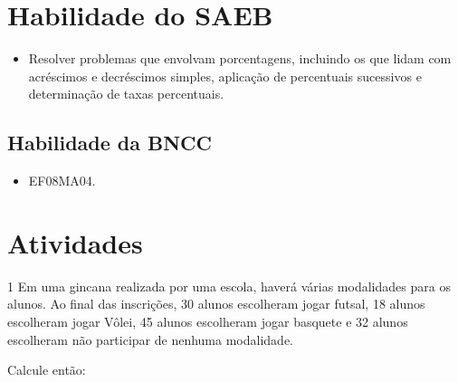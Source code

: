 \section{Habilidade do SAEB} 

\begin{itemize}
\item Resolver problemas que envolvam porcentagens,
incluindo os que lidam com acréscimos e decréscimos simples, aplicação
de percentuais sucessivos e determinação de taxas percentuais.
\end{itemize}

\subsection{Habilidade da BNCC}

\begin{itemize}
\item EF08MA04.
\end{itemize}






\pagebreak


\section{Atividades}

\num{1} Em uma gincana realizada por uma escola, haverá várias modalidades
para os alunos. Ao final das inscrições, 30 alunos escolheram jogar
futsal, 18 alunos escolheram jogar Vôlei, 45 alunos escolheram jogar
basquete e 32 alunos escolheram não participar de nenhuma modalidade.

Calcule então:

